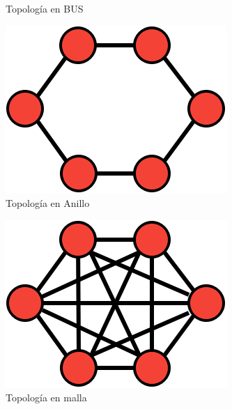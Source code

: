 \documentclass[a4paper, 11pt]{report} %
\begin{document}
\begin{figure}[H]
\begin{subfigure}[p]{0.24\textwidth}
\caption{Topología en BUS}
\end{subfigure}
\begin{subfigure}[p]{0.24\textwidth}
\includegraphics[width=\textwidth]{Resources/Top/Anillo.png}
\caption{Topología en Anillo}
\end{subfigure}
\begin{subfigure}[p]{0.3\textwidth}
\includegraphics[width=\textwidth]{Resources/Top/Malla.png}
\caption{Topología en malla}
\end{subfigure}
\begin{subfigure}[p]{0.2\textwidth}

\end{subfigure}
\end{figure}
\end{document}
